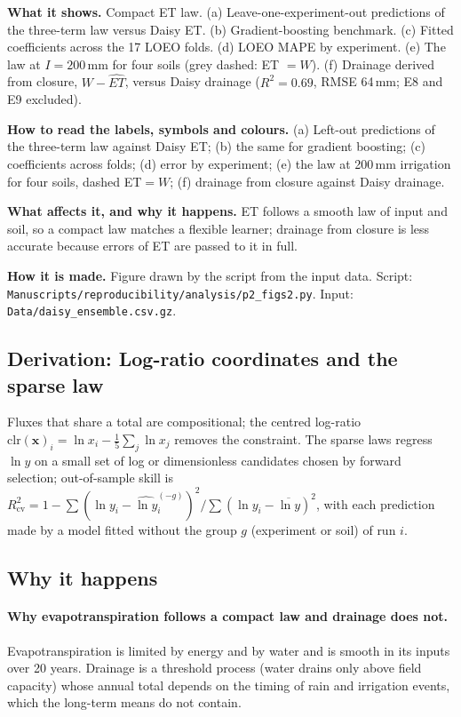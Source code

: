 \textbf{What it shows.} Compact ET law. (a) Leave-one-experiment-out predictions of the three-term law versus Daisy ET. (b) Gradient-boosting benchmark. (c) Fitted coefficients across the 17 LOEO folds. (d) LOEO MAPE by experiment. (e) The law at $I=200$\,mm for four soils (grey dashed: ET $=W$). (f) Drainage derived from closure, $W-\widehat{\mathit{ET}}$, versus Daisy drainage ($R^2=0.69$, RMSE 64\,mm; E8 and E9 excluded).

\textbf{How to read the labels, symbols and colours.} (a) Left-out predictions of the three-term law against Daisy ET; (b) the same for gradient boosting; (c) coefficients across folds; (d) error by experiment; (e) the law at 200\,mm irrigation for four soils, dashed ET$=W$; (f) drainage from closure against Daisy drainage.

\textbf{What affects it, and why it happens.} ET follows a smooth law of input and soil, so a compact law matches a flexible learner; drainage from closure is less accurate because errors of ET are passed to it in full.

\textbf{How it is made.} Figure drawn by the script from the input data. Script: \nolinkurl{Manuscripts/reproducibility/analysis/p2_figs2.py}. Input: \nolinkurl{Data/daisy_ensemble.csv.gz}.


\subsection{Derivation: Log-ratio coordinates and the sparse law}\label{der:s1:8}
Fluxes that share a total are compositional; the centred log-ratio $\mathrm{clr}(\mathbf x)_i=\ln x_i-\tfrac15\sum_j\ln x_j$ removes the constraint. The sparse laws regress $\ln y$ on a small set of log or dimensionless candidates chosen by forward selection; out-of-sample skill is $R^2_{\mathrm{cv}}=1-\sum(\ln y_i-\widehat{\ln y}_i^{(-g)})^2/\sum(\ln y_i-\overline{\ln y})^2$, with each prediction made by a model fitted without the group $g$ (experiment or soil) of run $i$.


\subsection{Why it happens}
\paragraph{Why evapotranspiration follows a compact law and drainage does not.} Evapotranspiration is limited by energy and by water and is smooth in its inputs over 20 years. Drainage is a threshold process (water drains only above field capacity) whose annual total depends on the timing of rain and irrigation events, which the long-term means do not contain.

